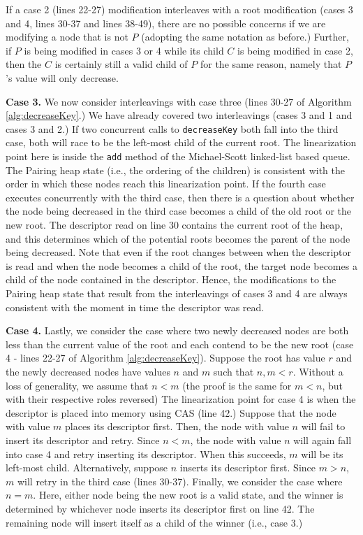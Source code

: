 \documentclass{acm_proc_article-sp}
\begin{document}
If a case 2 (lines 22-27) modification interleaves with
a root modification (cases 3 and 4, lines 30-37 and lines 38-49),
there are no possible concerns if we are modifying a node that
is not $P$ (adopting the same notation as before.) Further, if
$P$ is being modified in cases 3 or 4 while its child $C$ is being
modified in case 2, then the $C$ is certainly still a valid
child of $P$ for the same reason, namely that $P$'s value will only decrease.

\textbf{Case 3.} 
We now consider interleavings with case three (lines 30-27 of Algorithm
\ref{alg:decreaseKey}.) We have already covered two interleavings (cases 3 and 1
and cases 3 and 2.) If two concurrent calls to \texttt{decreaseKey}
both fall into the third case, both will race to be the left-most child
of the current root. The linearization point here is inside the \texttt{add}
method of the Michael-Scott \cite{michael96} linked-list based queue.
The Pairing heap state (i.e., the ordering of the children) is consistent with the order
in which these nodes reach this linearization point. If the fourth case
executes concurrently with the third case, then there is a question about
whether the node being decreased in the third case becomes a child of
the old root or the new root. The descriptor read on line 30 contains
the current root of the heap, and this determines which of the potential
roots becomes the parent of the node being decreased. Note that even
if the root changes between when the descriptor is read and when
the node becomes a child of the root, the target node becomes a child
of the node contained in the descriptor. Hence, the modifications
to the Pairing heap state that result from the interleavings of cases 3
and 4 are always consistent with the moment in time the descriptor was read.

\textbf{Case 4.} 
Lastly, we consider the case where two newly decreased nodes are both
less than the current value of the root and each contend to be the new
root (case 4 - lines 22-27 of Algorithm \ref{alg:decreaseKey}). Suppose
the root has value $r$ and the newly decreased nodes have values $n$ and $m$
such that $n, m < r$. Without a loss of generality, we assume that $n < m$
(the proof is the same for $m < n$, but with their respective roles
reversed) The linearization point for case 4 is when the descriptor
is placed into memory using CAS (line 42.) Suppose that the node
with value $m$ places its descriptor first. Then, the node with
value $n$ will fail to insert its descriptor and retry. Since $n < m$,
the node with value $n$ will again fall into case 4 and retry inserting
its descriptor. When this succeeds, $m$ will be its left-most child.
Alternatively, suppose $n$ inserts its descriptor first. Since $m > n$, 
$m$ will retry in the third case (lines 30-37). Finally,
we consider the case where $n = m$. Here, either node being
the new root is a valid state, and the winner is determined by whichever
node inserts its descriptor first on line 42. The remaining node will insert
itself as a child of the winner (i.e., case 3.)
\end{document}
